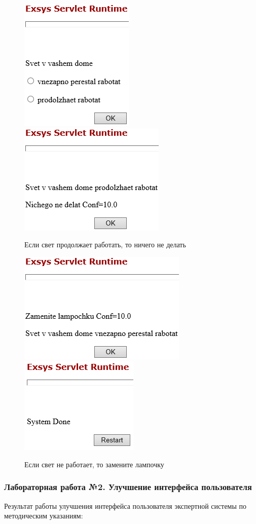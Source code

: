 \documentclass[14pt,a4paper,report]{report}
\begin{document}
\begin{figure}[ht!]
	\includegraphics[width=.25\textwidth]{images/1_3.png}\hfill
	\includegraphics[width=.40\textwidth]{images/1_5.png}
	\caption{Если свет продолжает работать, то ничего не делать}
\end{figure}

\begin{figure}[ht!]
	\includegraphics[width=.35\textwidth]{images/1_4.png}\hfill
	\includegraphics[width=.30\textwidth]{images/1_6.png}
	\caption{Если свет не работает, то замените лампочку}
\end{figure}

\subsubsection{Лабораторная работа №2. Улучшение интерфейса пользователя}

Результат работы улучшения интерфейса пользователя экспертной системы по методическим указаниям:
\end{document}
